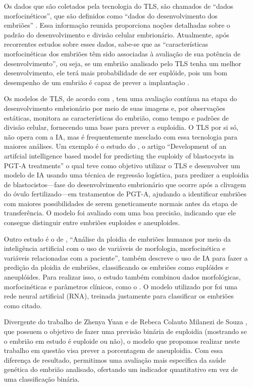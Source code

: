 Os dados que são coletados pela tecnologia do TLS, são chamados de “dados morfocinéticos”, que são definidos como “dados do desenvolvimento dos embriões” \cite{oliveira2024}. Essa informação reunida proporciona noções detalhadas sobre o padrão do desenvolvimento e divisão celular embrionário. Atualmente, após recorrentes estudos sobre esses dados, sabe-se que as “características morfocinéticas dos embriões têm sido associadas à avaliação de sua potência de desenvolvimento”, ou seja, se um embrião analisado pelo TLS tenha um melhor desenvolvimento, ele terá mais probabilidade de ser euplóide, pois um bom desempenho de um embrião é capaz de prever a implantação \cite{yuan2023}.

Os modelos de TLS, de acordo com , tem uma avaliação contínua na etapa do desenvolvimento embrionário por meio de suas imagens e, por observações estáticas, monitora as características do embrião, como tempo e padrões de divisão celular, fornecendo uma base para prever a euploidia. O TLS por si só, não opera com a IA, mas é frequentemente mesclado com essa tecnologia para maiores análises. Um exemplo é o estudo do , o artigo “Development of an artifcial intelligence based model for predicting the euploidy of blastocysts in PGT‐A treatments” o qual teve como objetivo utilizar o TLS e desenvolver um modelo de IA usando uma técnica de regressão logística, para predizer a euploidia de blastocistos—fase do desenvolvimento embrionário que ocorre após a clivagem do óvulo fertilizado—em tratamentos de PGT-A, ajudando a identificar embriões com maiores possibilidades de serem geneticamente normais antes da etapa de transferência. O modelo foi avaliado com uma boa precisão, indicando que ele consegue distinguir entre embriões euploides e aneuploides.

Outro estudo é o de , “Análise da ploidia de embriões humanos por meio da inteligência artificial com o uso de variáveis de morfologia, morfocinética e variáveis relacionadas com a paciente”, também descreve o uso de IA para fazer a predição da ploidia de embriões, classificando os embriões como euplóides e aneuplóides. Para realizar isso, o estudo também combinou dados morfológicas, morfocinéticas e parâmetros clínicos, como o . O modelo utilizado por foi uma rede neural artificial (RNA), treinada justamente para classificar os embriões como citado.

Divergente do trabalho de Zhenya Yuan \cite{yuan2023} e de Rebeca Colauto Milanezi de Souza \cite{souzarebeca2022}, que possuem o objetivo de fazer uma previsão binária de euploidia (mostrando se o embrião em estudo é euploide ou não), o modelo que propomos realizar neste trabalho em questão visa prever a porcentagem de aneuploidia. Com essa diferença de resultado, permitimos uma avaliação mais específica da saúde genética do embrião analisado, ofertando um indicador quantitativo em vez de uma classificação binária.

